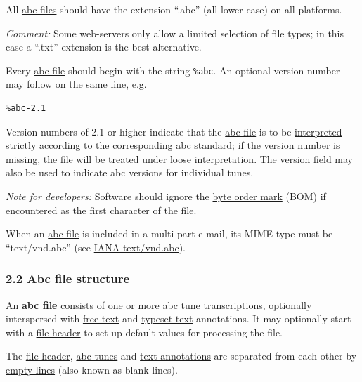 \documentclass[oneside]{book}
\begin{document}
All \protect\hyperlink{abc_file_definition}{abc files} should have the
extension ``.abc'' (all lower-case) on all platforms.

\emph{Comment:} Some web-servers only allow a limited selection of file
types; in this case a ``.txt'' extension is the best alternative.

Every \protect\hyperlink{abc_file_definition}{abc file} should begin
with the string \texttt{\%abc}. An optional version number may follow on
the same line, e.g.

\begin{verbatim}
%abc-2.1
\end{verbatim}

Version numbers of 2.1 or higher indicate that the
\protect\hyperlink{abc_file_definition}{abc file} is to be
\protect\hyperlink{strict_interpretation}{interpreted strictly}
according to the corresponding abc standard; if the version number is
missing, the file will be treated under
\protect\hyperlink{loose_interpretation}{loose interpretation}. The
\protect\hyperlink{version_field}{version field} may also be used to
indicate abc versions for individual tunes.

\emph{Note for developers:} Software should ignore the
\href{http://en.wikipedia.org/wiki/Byte_order_mark}{byte order mark}
(BOM) if encountered as the first character of the file.

When an \protect\hyperlink{abc_file_definition}{abc file} is included in
a multi-part e-mail, its MIME type must be ``text/vnd.abc'' (see
\href{http://www.iana.org/assignments/media-types/text/vnd.abc}{IANA
text/vnd.abc}).

\hypertarget{abc_file_structure}{\subsubsection{2.2 Abc file
structure}\label{abc_file_structure}}

\href{}{}An \textbf{abc file} consists of one or more
\protect\hyperlink{abc_tune_definition}{abc tune} transcriptions,
optionally interspersed with
\protect\hyperlink{free_text_definition}{free text} and
\protect\hyperlink{typeset_text_definition}{typeset text} annotations.
It may optionally start with a
\protect\hyperlink{file_header_definition}{file header} to set up
default values for processing the file.

The \protect\hyperlink{file_header_definition}{file header},
\protect\hyperlink{abc_tune_definition}{abc tunes} and
\protect\hyperlink{free_text_and_typeset_text}{text annotations} are
separated from each other by
\protect\hyperlink{empty_line_definition}{empty lines} (also known as
blank lines).
\end{document}

